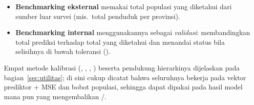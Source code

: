 \begin{itemize}
  \item \textbf{Benchmarking eksternal} memakai total populasi yang diketahui
        dari sumber luar survei (mis.\ total penduduk per provinsi).
  \item \textbf{Benchmarking internal} menggunakannya sebagai \emph{validasi}:
         membandingkan total prediksi terhadap total yang
        diketahui dan menandai status  bila selisihnya di
        bawah toleransi ().
\end{itemize}

Empat metode kalibrasi (, , ,
) beserta pendukung hierarkinya dijelaskan pada
bagian~\ref{sec:utilitas}; di sini cukup dicatat bahwa seluruhnya bekerja pada
vektor prediktor + MSE dan bobot populasi, sehingga dapat dipakai pada hasil
model mana pun yang mengembalikan /.
